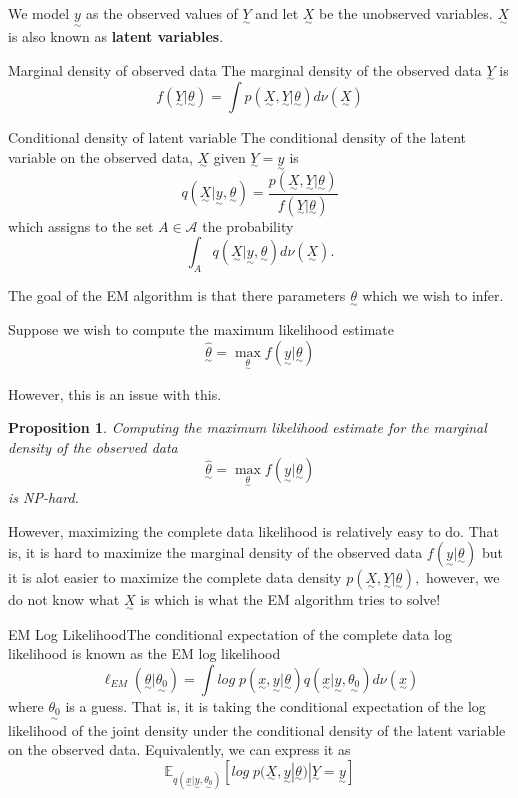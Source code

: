 \documentclass[twoside]{article}
\newtheorem{proposition}[theorem]{Proposition}
\newcommand{\utilde}{\underset{\sim}}
\begin{document}
We model $\utilde{y}$ as the observed values of $\utilde{Y}$ and let $\utilde{X}$ be the unobserved variables. $\utilde{X}$ is also known as \textbf{latent variables}.

\begin{definition_exam}{Marginal density of observed data}{}
The marginal density of the observed data $\utilde{Y}$ is 
$$
f(\utilde{Y}|\utilde{\theta}) = \int p(\utilde{X},\utilde{Y}|\utilde{\theta})d\nu(\utilde{X})
$$
\end{definition_exam}

\begin{definition_exam}{Conditional density of latent variable}{}
The conditional density of the latent variable on the observed data, $\utilde{X}$ given $\utilde{Y} = \utilde{y}$ is 
$$
q(\utilde{X}|\utilde{y}, \utilde{\theta}) = \frac{p(\utilde{X}, \utilde{Y}| \utilde{\theta})}{f(\utilde{Y}|\utilde{\theta})}
$$
which assigns to the set $A \in \mathcal{A}$ the probability
$$
\int_Aq(\utilde{X}|\utilde{y},\utilde{\theta})d\nu(\utilde{X}).
$$
\end{definition_exam}

The goal of the EM algorithm is that there parameters $\utilde{\theta}$ which we wish to infer.

Suppose we wish to compute the maximum likelihood estimate 
$$
\hat{\utilde{\theta}} = \max_{\utilde{\theta}}f(\utilde{y}|\utilde{\theta})
$$

However, this is an issue with this.
\begin{proposition}Computing the maximum likelihood estimate for the marginal density of the observed data 
$$
\hat{\utilde{\theta}} = \max_{\utilde{\theta}}f(\utilde{y}|\utilde{\theta})
$$
is NP-hard.
\end{proposition}

However, maximizing the complete data likelihood is relatively easy to do. That is, it is hard to maximize the marginal density of the observed data $f(\utilde{y}|\utilde{\theta})$ but it is alot easier to maximize the complete data density $p(\utilde{X},\utilde{Y}|\utilde{\theta}),$ however, we do not know what $\utilde{X}$ is which is what the EM algorithm tries to solve!

\begin{definition_exam}{EM Log Likelihood}{}The conditional expectation of the complete data log likelihood is known as the EM log likelihood
$$
\ell_{EM}(\utilde{\theta}|\utilde{\theta_0})  = \int log\;p(\utilde{x},\utilde{y}|\utilde{\theta})q(\utilde{x}|\utilde{y}, \utilde{\theta_0})d\nu(\utilde{x})
$$
where $\utilde{\theta_0}$ is a guess. That is, it is taking the conditional expectation of the log likelihood of the joint density under the conditional density of the latent variable on the observed data. Equivalently, we can express it as
$$
\mathbb{E}_{q(\utilde{x}|\utilde{y}, \utilde{\theta_0})}[log\; p(\utilde{X},\utilde{y}|\utilde{\theta})|\utilde{Y} = \utilde{y}]
$$
\end{definition_exam}
\end{document}
